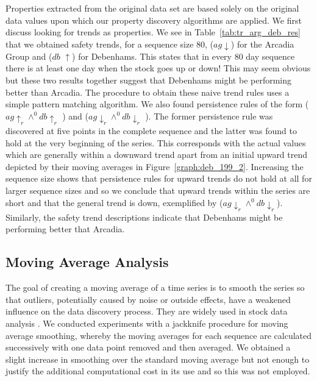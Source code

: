 Properties extracted from the original data set are based solely on
the original data values upon which our property discovery algorithms
are applied. We first discuss looking for trends as properties. We see
in Table~\ref{tab:tr_arg_deb_res} that we obtained safety trends, for
a sequence 
size 80,  ($ag \downarrow$) for the Arcadia Group and 
($db$ $\uparrow$) for Debenhams. This states that in every 80 day sequence
there is at least one day when the stock goes up or down! This may seem
obvious but these two results together suggest that Debenhams might be
performing better than Arcadia. The procedure to obtain these naive trend
rules uses a simple pattern matching algorithm. We also found 
persistence rules of the form 
   ($ag \uparrow_r \wedge^{0} db \uparrow_r$ ) and  
($ag \downarrow_r \wedge^{0} db \downarrow_r$ ). The former
persistence rule was 
discovered at five points in the complete sequence and the latter was found to
hold at the very beginning of the series. This corresponds with the
actual values which are generally within a downward trend apart from
an initial upward trend depicted by their moving averages in Figure~\ref{graph:deb_199_2}. Increasing the sequence size shows that
persistence rules for upward trends do not hold at all for larger
sequence sizes and so we conclude that upward trends within the series
are short and that the general trend is down, exemplified by
 ($ag \downarrow_r \wedge^0 db \downarrow_r$). Similarly,
the safety 
trend descriptions indicate that Debenhams might be performing better
that Arcadia.
			

\subsection{Moving Average Analysis}\label{subsec:tr_mav_analysis}

The goal of creating a moving average of a time series is to smooth
the series so that outliers, potentially caused by noise or outside
effects, have a weakened influence on the data discovery
process. They are widely used in stock data analysis \cite{rm97}.
 We conducted experiments with a jackknife procedure for moving
average smoothing, 
whereby the moving averages for each sequence are calculated
successively with one data point removed and then averaged. We obtained a
slight increase in smoothing over the standard moving average but not
enough to justify the additional computational cost in its use and so
this was not employed. 

